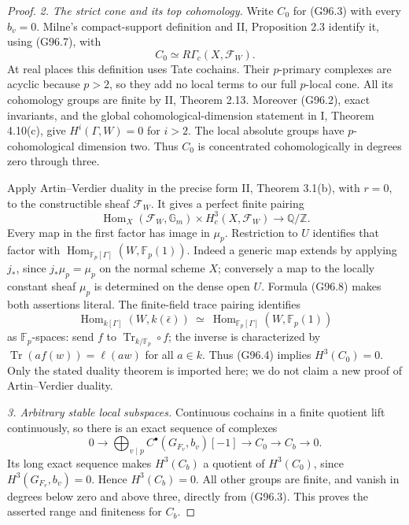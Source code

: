 \begin{proof}
\emph{2. The strict cone and its top cohomology.}
Write \(C_0\) for (G96.3) with every \(b_v=0\).
Milne's compact-support definition and II, Proposition 2.3
identify it, using (G96.7), with
\[
                         C_0\simeq R\Gamma_c(X,\mathcal F_W).
 \tag{G96.9}
\]
At real places this definition uses Tate cochains.  Their
\(p\)-primary complexes are acyclic because \(p>2\), so they
add no local terms to our full \(p\)-local cone.
All its cohomology groups are finite by II, Theorem 2.13.
Moreover (G96.2), exact invariants, and the global
cohomological-dimension statement in I, Theorem 4.10(c), give
\(H^i(\Gamma,W)=0\) for \(i>2\).  The local absolute groups
have \(p\)-cohomological dimension two.  Thus \(C_0\) is
concentrated cohomologically in degrees zero through three.

Apply Artin--Verdier duality in the precise form II,
Theorem 3.1(b), with \(r=0\), to the constructible sheaf
\(\mathcal F_W\).  It gives a perfect finite pairing
\[
 \operatorname{Hom}_X(\mathcal F_W,\mathbb G_m)
       \times H^3_c(X,\mathcal F_W)\longrightarrow\mathbb Q/\mathbb Z.
 \tag{G96.10}
\]
Every map in the first factor has image in \(\mu_p\).
Restriction to \(U\) identifies that factor with
\(\operatorname{Hom}_{\mathbb F_p[\Gamma]}(W,\mathbb F_p(1))\).
Indeed a generic map extends by applying \(j_*\), since
\(j_*\mu_p=\mu_p\) on the normal scheme \(X\); conversely a map
to the locally constant sheaf \(\mu_p\) is determined on the
dense open \(U\).  Formula (G96.8) makes both assertions literal.
The finite-field trace pairing identifies
\[
 \operatorname{Hom}_{k[\Gamma]}(W,k(\bar\epsilon))
   \ \simeq\
 \operatorname{Hom}_{\mathbb F_p[\Gamma]}(W,\mathbb F_p(1))
 \tag{G96.11}
\]
as \(\mathbb F_p\)-spaces: send \(f\) to
\(\operatorname{Tr}_{k/\mathbb F_p}\circ f\); the inverse is
characterized by
\(\operatorname{Tr}(a f(w))=\ell(aw)\) for all \(a\in k\).
Thus (G96.4) implies \(H^3(C_0)=0\).
Only the stated duality theorem is imported here; we do not
claim a new proof of Artin--Verdier duality.

\emph{3. Arbitrary stable local subspaces.}
Continuous cochains in a finite quotient lift continuously,
so there is an exact sequence of complexes
\[
 0\longrightarrow
       \bigoplus_{v\mid p}C^\bullet(G_{F_v},b_v)[-1]
 \longrightarrow C_0\longrightarrow C_b\longrightarrow0.
 \tag{G96.12}
\]
Its long exact sequence makes \(H^3(C_b)\) a quotient of
\(H^3(C_0)\), since \(H^3(G_{F_v},b_v)=0\).  Hence
\(H^3(C_b)=0\).  All other groups are finite, and vanish in
degrees below zero and above three, directly from (G96.3).
This proves the asserted range and finiteness for \(C_b\).


\end{proof}
